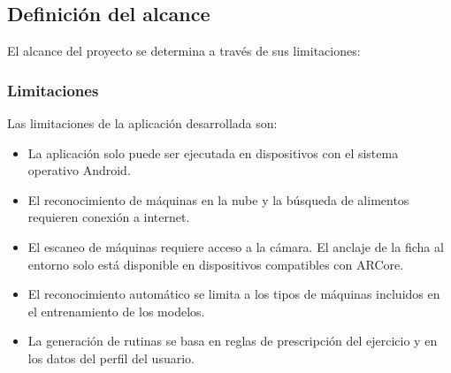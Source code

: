 \clearpage
\subsection{Definición del alcance}
\label{sec:des-alcance}

El alcance del proyecto se determina a través de sus limitaciones:

\subsubsection{Limitaciones}

Las limitaciones de la aplicación desarrollada son:

\begin{itemize}
    \item La aplicación solo puede ser ejecutada en dispositivos con el sistema operativo Android.

    \item El reconocimiento de máquinas en la nube y la búsqueda de
    alimentos requieren conexión a internet.

    \item El escaneo de máquinas requiere acceso a la cámara. El anclaje
    de la ficha al entorno solo está disponible en dispositivos
    compatibles con ARCore.

    \item El reconocimiento automático se limita a los tipos de máquinas
    incluidos en el entrenamiento de los modelos.

    \item La generación de rutinas se basa en reglas de prescripción del
    ejercicio y en los datos del perfil del usuario.
    
\end{itemize}

